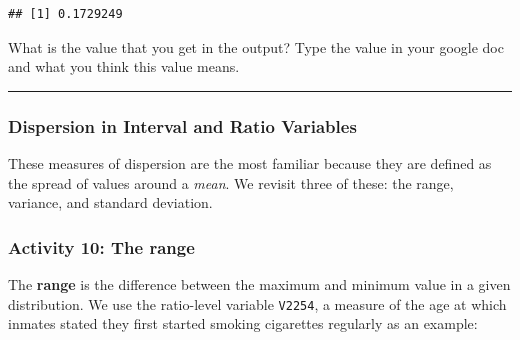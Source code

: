 \documentclass[
]{book}
\newenvironment{Shaded}{\begin{snugshade}}{\end{snugshade}}
\newcommand{\AttributeTok}[1]{\textcolor[rgb]{0.77,0.63,0.00}{#1}}
\newcommand{\CommentTok}[1]{\textcolor[rgb]{0.56,0.35,0.01}{\textit{#1}}}
\newcommand{\ConstantTok}[1]{\textcolor[rgb]{0.00,0.00,0.00}{#1}}
\newcommand{\FunctionTok}[1]{\textcolor[rgb]{0.00,0.00,0.00}{#1}}
\newcommand{\NormalTok}[1]{#1}
\newcommand{\OtherTok}[1]{\textcolor[rgb]{0.56,0.35,0.01}{#1}}
\newcommand{\SpecialCharTok}[1]{\textcolor[rgb]{0.00,0.00,0.00}{#1}}
\begin{document}
\begin{Shaded}
\end{Shaded}

\begin{verbatim}
## [1] 0.1729249
\end{verbatim}

What is the value that you get in the output? Type the value in your google doc and what you think this value means.

\begin{center}\rule{0.5\linewidth}{0.5pt}\end{center}

\hypertarget{dispersion-in-interval-and-ratio-variables}{%
\subsubsection{\texorpdfstring{\textbf{Dispersion in Interval and Ratio Variables}}{Dispersion in Interval and Ratio Variables}}\label{dispersion-in-interval-and-ratio-variables}}

These measures of dispersion are the most familiar because they are defined as the spread of values around a \emph{mean}. We revisit three of these: the range, variance, and standard deviation.

\hypertarget{activity-10-the-range}{%
\subsubsection{Activity 10: The range}\label{activity-10-the-range}}

The \textbf{range} is the difference between the maximum and minimum value in a given distribution. We use the ratio-level variable \texttt{V2254}, a measure of the age at which inmates stated they first started smoking cigarettes regularly as an example:

\begin{Shaded}
\end{Shaded}
\end{document}

